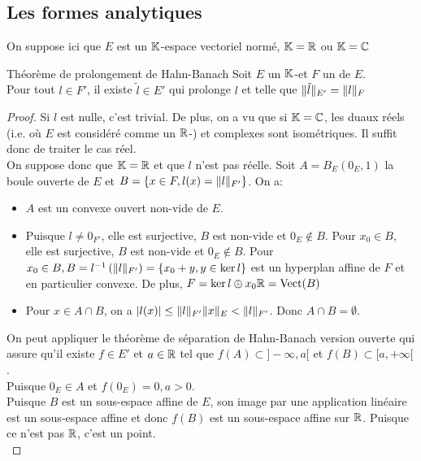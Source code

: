 \documentclass[]{report}
\begin{document}
    \subsection*{Les formes analytiques}

    On suppose ici que $E$ est un $\mathbb{K}$-espace vectoriel normé, $\mathbb{K}=\mathbb{R}$ ou $\mathbb{K}=\mathbb{C}$

    \begin{tm}{Théorème de prolongement de Hahn-Banach}{}
        Soit $E$ un $\mathbb{K}$-\evn et $F$ un \sev de $E$.\\
        Pour tout $l\in F'$, il existe $\tilde{l}\in E'$ qui prolonge $l$ et telle que $\lVert \tilde{l} \rVert_{E'}=\lVert l \rVert_{F}$
    \end{tm}

    \begin{proof}
        Si $l$ est nulle, c'est trivial. De plus, on a vu que si $\mathbb{K}=\mathbb{C}$, les duaux réels (i.e. où $E$ est considéré comme un $\mathbb{R}$-\ev) et complexes sont isométriques. Il suffit donc de traiter le cas réel.\\
        On suppose donc que $\mathbb{K}=\mathbb{R}$ et que $l$ n'est pas réelle. Soit $A=B_E(0_E,1)$ la boule ouverte de $E$ et $B=\{x\in F, l(x)=\lVert l \rVert_{F'}\}$. On a:
        \begin{itemize}
            \item $A$ est un convexe ouvert non-vide de $E$.
            \item Puisque $l\neq 0_{F'}$, elle est surjective, $B$ est non-vide et $0_E\notin B$. Pour $x_0\in B$, elle est surjective, $B$ est non-vide et $0_E\notin B$. Pour $x_0\in B,B=l^{-1}\left( \lVert l \rVert_{F'}\right)=\{x_0+y,y\in \ker l\}$ est un hyperplan affine de $F$ et en particulier convexe. De plus, $F=\ker l\oplus x_0 \mathbb{R}=\text{Vect}(B)$
            \item Pour $x\in A\cap B$, on a $\left|l(x)\right|\le \lVert l \rVert_{F'}\lVert x \rVert_E<\lVert l \rVert_{F'}$. Donc $A\cap B=\emptyset$.\\
        \end{itemize}
        On peut appliquer le théorème de séparation de Hahn-Banach version ouverte qui assure qu'il existe $f\in E'$ et $a\in \mathbb{R}$ tel que $f(A)\subset ]-\infty,a[$ et $f(B)\subset [a,+\infty[$.\\
        Puisque $0_E\in A$ et $f(0_E)=0,a>0$.\\
        Puisque $B$ est un sous-espace affine de $E$, son image par une application linéaire est un sous-espace affine et donc $f(B)$ est un sous-espace affine sur $\mathbb{R}$. Puisque ce n'est pas $\mathbb{R}$, c'est un point.\\

\end{proof}
\end{document}
